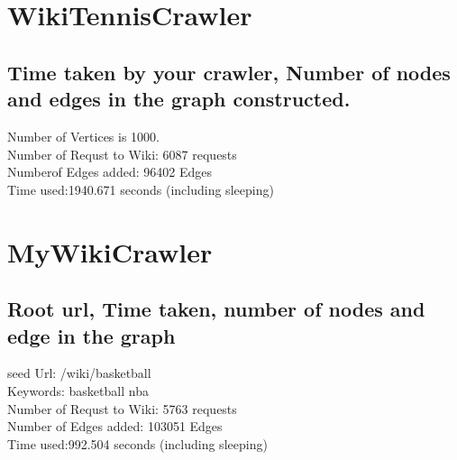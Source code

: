 \documentclass{article}
\begin{document}
\section{WikiTennisCrawler}
\subsection{Time taken by your crawler, Number of nodes and edges in the graph constructed.}
Number of Vertices is 1000.\\
Number of Requst to Wiki: 6087 requests\\
Numberof Edges added: 96402 Edges\\
Time used:1940.671 seconds (including sleeping)\\

\clearpage

\section{MyWikiCrawler}
\subsection{Root url, Time taken, number of nodes and edge in the graph}
seed Url: /wiki/basketball\\
Keywords: basketball nba\\
Number of Requst to Wiki: 5763 requests\\
Number of Edges added: 103051 Edges\\
Time used:992.504 seconds (including sleeping)\\

\clearpage
\end{document}
